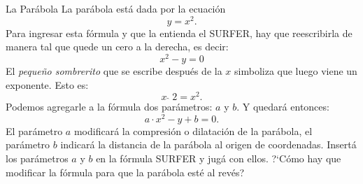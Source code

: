 \begin{surferPage}{La Parábola}
La par{\'a}bola est{\'a} dada por la ecuaci{\'o}n  \[y=x^2.\]
Para ingresar esta f{\'o}rmula y que la entienda el SURFER, hay que reescribirla de manera tal que quede un cero a la derecha, es decir:
\[x^2-y=0\]
El {\it peque{\~n}o sombrerito} que se escribe despu{\'e}s de la $x$ simboliza que luego viene un exponente. Esto es: 
\[ x  \,\hat{\ } \, 2 =x^2.\]
Podemos agregarle a la f{\'o}rmula dos par{\'a}metros: $a$ y $b$.\newline
Y quedar{\'a} entonces:
\[a \cdot x^2-y+b=0.\]
El par{\'a}metro $a$ modificar{\'a} la compresi{\'o}n o dilataci{\'o}n de la par{\'a}bola, el par{\'a}metro $b$ indicar{\'a} la distancia de la par{\'a}bola al origen de coordenadas.
\newline
Insert{\'a} los par{\'a}metros $a$ y $b$ en la f{\'o}rmula SURFER y jug{\'a} con ellos. ?`C{\'o}mo hay que  modificar la f{\'o}rmula para que la par{\'a}bola est{\'e} al rev{\'e}s?
\end{surferPage}
